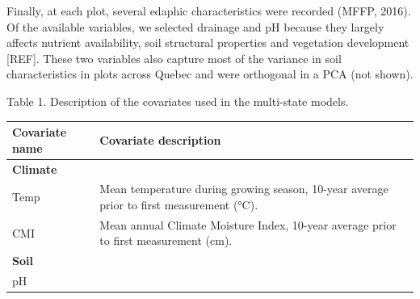 \documentclass[a4paperpaper,]{article}
\begin{document}
Finally, at each plot, several edaphic characteristics were recorded
(MFFP, 2016). Of the available variables, we selected drainage and pH
because they largely affects nutrient availability, soil structural
properties and vegetation development {[}REF{]}. These two variables
also capture most of the variance in soil characteristics in plots
across Quebec and were orthogonal in a PCA (not shown).

Table 1. Description of the covariates used in the multi-state models.

\begin{longtable}[]{@{}ll@{}}
\toprule
\begin{minipage}[b]{0.21\columnwidth}\raggedright
Covariate name\strut
\end{minipage} & \begin{minipage}[b]{0.73\columnwidth}\raggedright
Covariate description\strut
\end{minipage}\tabularnewline
\midrule
\endhead
\begin{minipage}[t]{0.21\columnwidth}\raggedright
\textbf{Climate}\strut
\end{minipage} & \begin{minipage}[t]{0.73\columnwidth}\raggedright
\strut
\end{minipage}\tabularnewline
\begin{minipage}[t]{0.21\columnwidth}\raggedright
Temp\strut
\end{minipage} & \begin{minipage}[t]{0.73\columnwidth}\raggedright
Mean temperature during growing season, 10-year average prior to first
measurement (°C).\strut
\end{minipage}\tabularnewline
\begin{minipage}[t]{0.21\columnwidth}\raggedright
CMI\strut
\end{minipage} & \begin{minipage}[t]{0.73\columnwidth}\raggedright
Mean annual Climate Moisture Index, 10-year average prior to first
measurement (cm).\strut
\end{minipage}\tabularnewline
\begin{minipage}[t]{0.21\columnwidth}\raggedright
\textbf{Soil}\strut
\end{minipage} & \begin{minipage}[t]{0.73\columnwidth}\raggedright
\strut
\end{minipage}\tabularnewline
\begin{minipage}[t]{0.21\columnwidth}\raggedright
pH\strut
\end{minipage} & \begin{minipage}[t]{0.73\columnwidth}\raggedright

\end{minipage}
\end{longtable}
\end{document}
